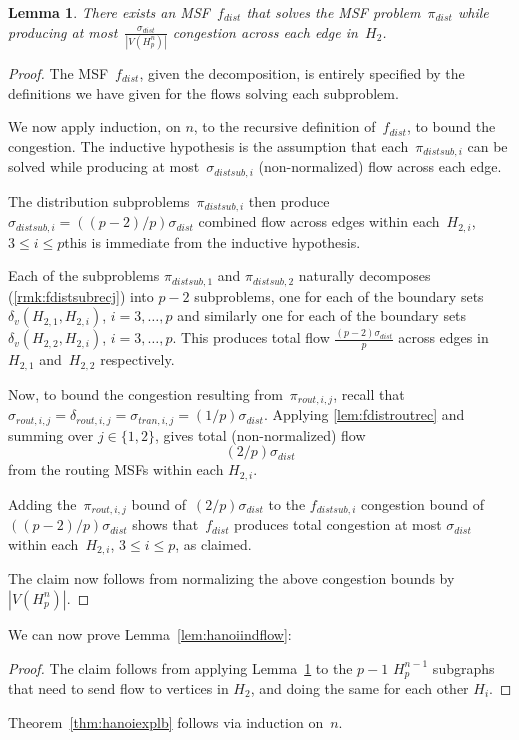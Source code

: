 \documentclass[
final
]{dmtcs-episciences}
\newtheorem{lemma}[theorem]{Lemma}
\begin{document}
\begin{lemma}
\label{lem:hanpartialcong}
There exists an MSF~$f_{dist}$ that solves the MSF problem~$\pi_{dist}$ while producing at most~$\frac{\sigma_{dist}}{|V(H_p^n)|}$ congestion across each edge in~$H_2$.
\end{lemma}
\begin{proof}

The MSF~$f_{dist}$, given the decomposition, is entirely specified by the definitions we have given for the flows solving each subproblem.

We now apply induction, on $n$, to the recursive definition of~$f_{dist}$, to bound the congestion. The inductive hypothesis is the assumption that each~$\pi_{distsub,i}$ can be solved while producing at most~$\sigma_{distsub,i}$ (non-normalized) flow across each edge.

The distribution subproblems~$\pi_{distsub,i}$ then produce $\sigma_{distsub,i} = ((p-2)/p)\sigma_{dist}$ combined flow across edges within each~$H_{2,i}$,  $3 \leq i \leq p$\textemdash this is immediate from the inductive hypothesis.

Each of the subproblems $\pi_{distsub,1}$ and $\pi_{distsub,2}$ naturally decomposes (\cref{rmk:fdistsubrecj}) into $p-2$ subproblems, one for each of the boundary sets $\delta_v(H_{2,1}, H_{2,i})$, $i = 3, \dots, p$ and similarly one for each of the boundary sets $\delta_v(H_{2,2}, H_{2,i})$, $i = 3, \dots, p$. This produces total flow $\frac{(p-2)\sigma_{dist}}{p}$ across edges in~$H_{2,1}$ and~$H_{2,2}$ respectively.

Now, to bound the congestion resulting from~$\pi_{rout,i,j}$, recall that $\sigma_{rout,i,j} = \delta_{rout,i,j} = \sigma_{tran,i,j} = (1/p)\sigma_{dist}$. Applying \cref{lem:fdistroutrec} and summing over $j \in \{1, 2\}$, gives total (non-normalized) flow
$$(2/p)\sigma_{dist}$$
from the routing MSFs within each $H_{2,i}$. 

Adding the~$\pi_{rout,i,j}$ bound of~$(2/p)\sigma_{dist}$ to the $f_{distsub,i}$ congestion bound of $((p-2)/p)\sigma_{dist}$ shows that~$f_{dist}$ produces total congestion at most $\sigma_{dist}$ within each~$H_{2,i}$, $3 \leq i \leq p$, as claimed.

The claim now follows from normalizing the above congestion bounds by $|V(H_p^n)|$.
\end{proof}

We can now prove Lemma~\ref{lem:hanoiindflow}:
\lemhanoiindflow*
\begin{proof}
The claim follows from applying Lemma~\ref{lem:hanpartialcong} to the $p - 1$ $H_p^{n-1}$ subgraphs that need to send flow to vertices in $H_2$, and doing the same for each other $H_i$.
\end{proof}

Theorem~\ref{thm:hanoiexplb} follows via induction on~$n$.


%

\label{sec:biblio}
\end{document}
